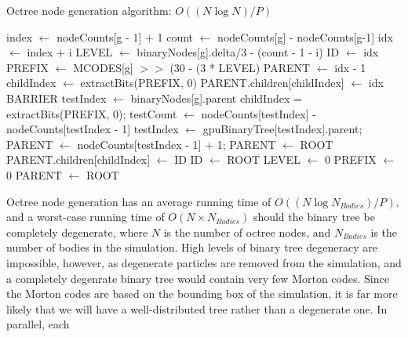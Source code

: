 \documentclass{thesis}
\begin{document}
\begin{algorithm}
    \label{alg:GenerateOctreeNodes}
    \caption{Octree node generation algorithm: $O((N \log N)/P)$}
    \begin{algorithmic}
                \State index $\gets$ nodeCounts[g - 1] + 1
                \State count $\gets$ nodeCounts[g] - nodeCounts[g-1]
                        \State idx $\gets$ index + i
                        \State LEVEL $\gets$ binaryNodes[g].delta/3 - (count - 1 - i)
                        \State ID $\gets$ idx
                        \State PREFIX $\gets$ MCODES[g] $>>$ (30 - (3 * LEVEL)
                            \State PARENT $\gets$ idx - 1
                            \State childIndex $\gets$ extractBits(PREFIX, 0)
                            \State PARENT.children[childIndex] $\gets$ idx
                        \EndIf
                    \EndFor
                \EndIf
                \State BARRIER
                    \State testIndex $\gets$ binaryNodes[g].parent
                    \State childIndex = extractBits(PREFIX, 0);
                    \State testCount $\gets$ nodeCounts[testIndex] - nodeCounts[testIndex - 1]
                        \State testIndex $\gets$ gpuBinaryTree[testIndex].parent;
                    \EndWhile
                        \State PARENT $\gets$ nodeCounts[testIndex - 1] + 1;
                    \Else
                        \State PARENT $\gets$ ROOT
                    \EndIf
                    \State PARENT.children[childIndex] $\gets$ ID
                \EndIf
            \Else
                \State ID $\gets$ ROOT
                \State LEVEL $\gets$ 0
                \State PREFIX $\gets$ 0
                \State PARENT $\gets$ ROOT   
            \EndIf
        \EndFor
    \end{algorithmic}
\end{algorithm}
Octree node generation has an average running time of $O((N \log N_{Bodies}) / P)$, and a worst-case running time of $O(N \times N_{Bodies})$ should the binary tree be completely degenerate, where $N$ is the number of octree nodes, and $N_{Bodies}$ is the number of bodies in the simulation. High levels of binary tree degeneracy are impossible, however, as degenerate particles are removed from the simulation, and a completely degenrate binary tree would contain very few Morton codes. Since the Morton codes are based on the bounding box of the simulation, it is far more likely that we will have a well-distributed tree rather than a degenerate one. In parallel, each
\end{document}
